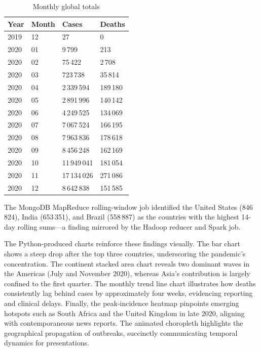 \documentclass[12pt, a4paper]{article}
\begin{document}
\begin{table}[H]
    \centering
    \caption{Monthly global totals}
    \label{tab:monthly-trend}
    \begin{tabular}{@{}p{1.8cm}p{1.8cm}p{2.6cm}p{2.6cm}@{}}
        \toprule
        Year & Month & Cases & Deaths \\
        \midrule
        2019 & 12 & 27 & 0 \\
        2020 & 01 & 9\,799 & 213 \\
        2020 & 02 & 75\,422 & 2\,708 \\
        2020 & 03 & 723\,738 & 35\,814 \\
        2020 & 04 & 2\,339\,594 & 189\,180 \\
        2020 & 05 & 2\,891\,996 & 140\,142 \\
        2020 & 06 & 4\,249\,525 & 134\,069 \\
        2020 & 07 & 7\,067\,524 & 166\,195 \\
        2020 & 08 & 7\,963\,836 & 178\,618 \\
        2020 & 09 & 8\,456\,248 & 162\,169 \\
        2020 & 10 & 11\,949\,041 & 181\,054 \\
        2020 & 11 & 17\,134\,026 & 271\,086 \\
        2020 & 12 & 8\,642\,838 & 151\,585 \\
        \bottomrule
    \end{tabular}
\end{table}

The MongoDB MapReduce rolling-window job identified the United States (846\,824), India (653\,351), and Brazil (558\,887) as the countries with the highest 14-day rolling sums—a finding mirrored by the Hadoop reducer and Spark job.

The Python-produced charts reinforce these findings visually. The bar chart shows a steep drop after the top three countries, underscoring the pandemic's concentration. The continent stacked area chart reveals two dominant waves in the Americas (July and November 2020), whereas Asia's contribution is largely confined to the first quarter. The monthly trend line chart illustrates how deaths consistently lag behind cases by approximately four weeks, evidencing reporting and clinical delays. Finally, the peak-incidence heatmap pinpoints emerging hotspots such as South Africa and the United Kingdom in late 2020, aligning with contemporaneous news reports. The animated choropleth highlights the geographical propagation of outbreaks, succinctly communicating temporal dynamics for presentations.
\end{document}
